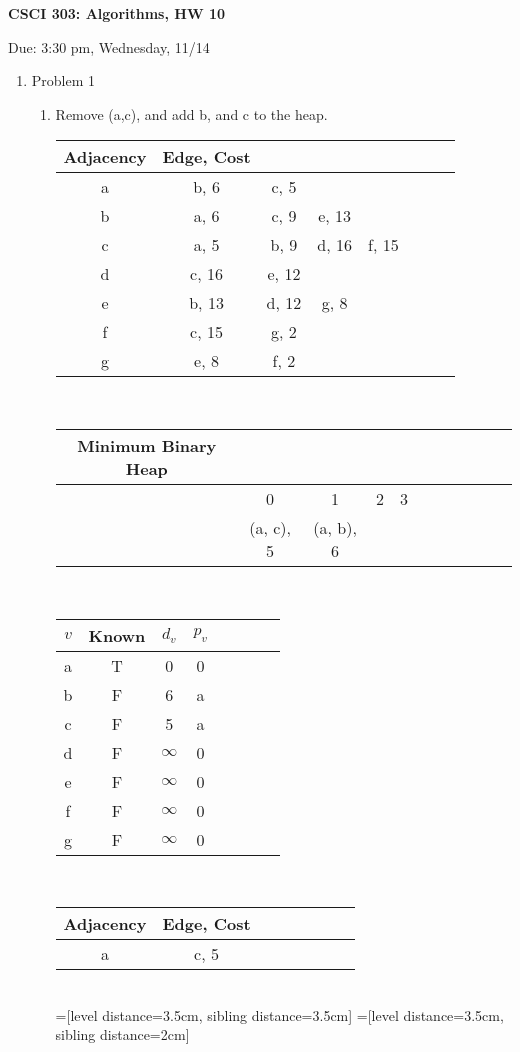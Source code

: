 \documentclass[11pt]{article}
\begin{document}
\begin{LARGE}
\centerline {\bf CSCI 303: Algorithms, HW 10}
\end{LARGE}
\vskip 0.25cm
\centerline{Due: 3:30 pm, Wednesday, 11/14}

\begin{enumerate}
\item Problem 1\\
\begin{enumerate}
\item Remove (a,c), and add b, and c to the heap.\\
\begin{tabular}{c|ccccccc|}
Adjacency& Edge, Cost\\\hline
a& b, 6 & c, 5\\
b&a, 6& c, 9& e, 13\\
c&a, 5&b, 9& d, 16& f, 15\\
d& c, 16& e, 12&\\
e&b, 13&d, 12& g, 8\\
f& c, 15& g, 2\\
g& e, 8&f, 2
\end{tabular}\\
\begin{tabular}{ccccccccccc}
Minimum Binary Heap\\\hline
&0&1&2&3\\
&(a, c), 5 & (a, b), 6\\
\end{tabular}\\
\begin{tabular}{c|ccccccc|}
$v$& Known& $d_v$ & $p_v$\\\hline
a& T & 0& 0\\
b&F & 6 & a\\
c&F & 5 & a\\
d&F & $\infty$ & 0\\
e&F & $\infty$ & 0\\
f&F & $\infty$ & 0\\
g&F & $\infty$ & 0
\end{tabular}\\
\begin{tabular}{c|ccccccc|}
Adjacency& Edge, Cost\\\hline
a& c, 5\\
\end{tabular}\\
=[level distance=3.5cm, sibling distance=3.5cm]
=[level distance=3.5cm, sibling distance=2cm]


\end{enumerate}
\end{enumerate}
\end{document}
